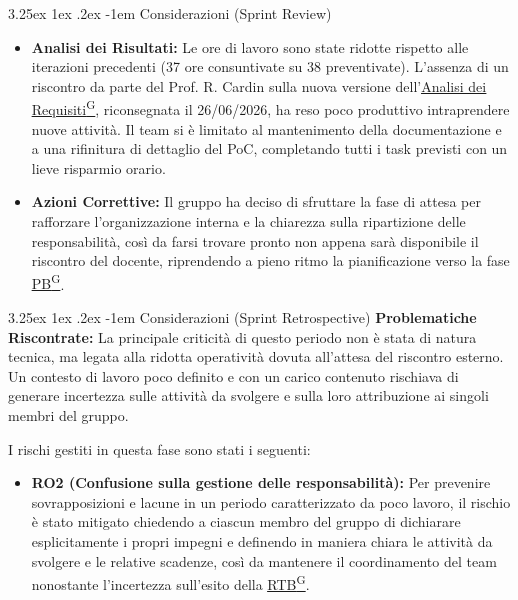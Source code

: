 \documentclass[a4paper,12pt]{article}
\makeatletter
\renewcommand\paragraph{\@startsection{paragraph}{5}{\z@}%
  {3.25ex \@plus1ex \@minus.2ex}%
  {-1em}%
  {\normalfont\normalsize\bfseries}}
\providecommand{\glslink}[2]{\href{https://alittlebyte-19.github.io/Documentazione/glossario.html\#gls-#1}{\underline{#2}\textsuperscript{\scriptsize G}}}
\makeatother
\begin{document}
\paragraph{Considerazioni (Sprint Review)}
\begin{itemize}
    \item \textbf{Analisi dei Risultati:} Le ore di lavoro sono state ridotte rispetto alle iterazioni precedenti (37 ore consuntivate su 38 preventivate). L'assenza di un riscontro da parte del Prof. R. Cardin sulla nuova versione dell'\glslink{analisi-dei-requisiti-adr}{Analisi dei Requisiti}, riconsegnata il 26/06/2026, ha reso poco produttivo intraprendere nuove attività. Il team si è limitato al mantenimento della documentazione e a una rifinitura di dettaglio del PoC, completando tutti i task previsti con un lieve risparmio orario.
    \item \textbf{Azioni Correttive:} Il gruppo ha deciso di sfruttare la fase di attesa per rafforzare l'organizzazione interna e la chiarezza sulla ripartizione delle responsabilità, così da farsi trovare pronto non appena sarà disponibile il riscontro del docente, riprendendo a pieno ritmo la pianificazione verso la fase \glslink{pb-product-baseline}{PB}.
\end{itemize}

\paragraph{Considerazioni (Sprint Retrospective)}
\textbf{Problematiche Riscontrate:} La principale criticità di questo periodo non è stata di natura tecnica, ma legata alla ridotta operatività dovuta all'attesa del riscontro esterno. Un contesto di lavoro poco definito e con un carico contenuto rischiava di generare incertezza sulle attività da svolgere e sulla loro attribuzione ai singoli membri del gruppo.

I rischi gestiti in questa fase sono stati i seguenti:
\begin{itemize}
    \item \textbf{RO2 (Confusione sulla gestione delle responsabilità):} Per prevenire sovrapposizioni e lacune in un periodo caratterizzato da poco lavoro, il rischio è stato mitigato chiedendo a ciascun membro del gruppo di dichiarare esplicitamente i propri impegni e definendo in maniera chiara le attività da svolgere e le relative scadenze, così da mantenere il coordinamento del team nonostante l'incertezza sull'esito della \glslink{rtb-requirements-and-technology-baseline}{RTB}.
\end{itemize}
\end{document}
